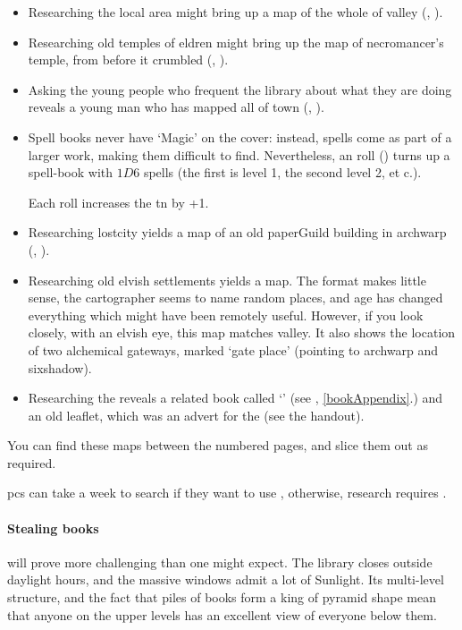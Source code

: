 \begin{multicols}{2}
\begin{itemize}
  \item
  Researching the local area might bring up a map of the whole of \gls{valley} (, \tn[14]).
  \item
  Researching old temples of \gls{eldren} might bring up the map of \gls{necromancer}'s temple, from before it crumbled (, \tn[10]).
  \item
  Asking the young people who frequent the library about what they are doing reveals a young man who has mapped all of \gls{town} (, \tn[10]).
  \item
  Spell books never have `Magic' on the cover: instead, spells come as part of a larger work, making them difficult to find.
  Nevertheless, an  roll (\tn[9]) turns up a spell-book with $1D6$ spells (the first is level 1, the second level 2, et c.).

  Each roll increases the \gls{tn} by +1.
  \item
  Researching \gls{lostcity} yields a map of an old \gls{paperGuild} building in \gls{archwarp} (, \tn[18]).
  \item
  Researching old elvish settlements yields a map.
  The format makes little sense, the cartographer seems to name random places, and age has changed everything which might have been remotely useful.
  However, if you look closely, with an elvish eye, this map matches \gls{valley}.
  It also shows the location of two alchemical gateways, marked `gate place' (pointing to \gls{archwarp} and \gls{sixshadow}).
  \item
  Researching the  reveals a related book called `' (see , \autoref{bookAppendix}.) and an old leaflet, which was an advert for the  (see the handout).
\end{itemize}

You can find these maps between the numbered pages, and slice them out as required.

\Glspl{pc} can take a week to search if they want to use , otherwise, research requires .

\paragraph{Stealing books}
will prove more challenging than one might expect.
The library closes outside daylight hours, and the massive windows admit a lot of Sunlight.
Its multi-level structure, and the fact that piles of books form a king of pyramid shape mean that anyone on the upper levels has an excellent view of everyone below them.


\end{multicols}
